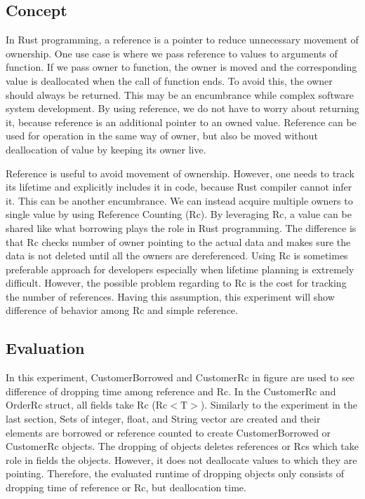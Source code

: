 \subsection{Concept}
In Rust programming, a reference is a pointer to reduce unnecessary movement of ownership. 
One use case is where we pass reference to values to arguments of function. 
If we pass owner to function, the owner is moved and the corresponding value is deallocated when the call of function ends. 
To avoid this, the owner should always be returned. This may be an encumbrance while complex software system development. 
By using reference, we do not have to worry about returning it, because reference is an additional pointer to an owned value. 
Reference can be used for operation in the same way of owner, but also be moved without deallocation of value by keeping its owner live. 

Reference is useful to avoid movement of ownership. However, one needs to track its lifetime and explicitly includes it in code, 
because Rust compiler cannot infer it. This can be another encumbrance. We can instead acquire multiple owners to single value by using Reference Counting (Rc). 
By leveraging Rc, a value can be shared like what borrowing plays the role in Rust programming. 
The difference is that Rc checks number of owner pointing to the actual data and makes sure the data is not deleted 
until all the owners are dereferenced. Using Rc is sometimes preferable approach for developers especially when lifetime planning is extremely difficult.
However, the possible problem regarding to Rc is the cost for tracking the number of references. 
Having this assumption, this experiment will show difference of behavior among Rc and simple reference.

\subsection{Evaluation}
In this experiment, CustomerBorrowed and CustomerRc in figure are used to see difference of dropping time among reference and Rc. 
In the CustomerRc and OrderRc struct, all fields take Rc (Rc$<$T$>$). Similarly to the experiment in the last section, 
Sets of integer, float, and String vector are created and their elements are borrowed or reference counted to create CustomerBorrowed or CustomerRc objects.
The dropping of objects deletes references or Rcs which take role in fields the objects. However, it does not deallocate values to which they are pointing. 
Therefore, the evaluated runtime of dropping objects only consists of dropping time of reference or Rc, but deallocation time.

